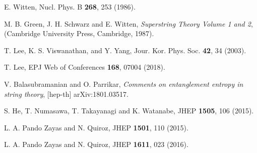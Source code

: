 \documentclass[aps,showpacs,showkeys]{revtex4}
\begin{document}
\begin{thebibliography}{0}
E. Witten, Nucl. Phys. B {\bf 268}, 253 (1986). 

M. B. Green, J. H. Schwarz and E. Witten, {\it Superstring Theory Volume 1 and 2},
(Cambridge University Press, Cambridge, 1987).
 
T. Lee, K. S. Viswanathan, and Y. Yang, Jour. Kor. Phys. Soc. {\bf 42}, 34 (2003).

T. Lee, EPJ Web of Conferences {\bf 168}, 07004 (2018).

V. Balasubramanian and O. Parrikar, 
{\it Comments on entanglement entropy in string theory},
[hep-th] arXiv:1801.03517.

S. He, T. Numasawa, T. Takayanagi and K. Watanabe, JHEP {\bf 1505}, 106 (2015). 

L. A. Pando Zayas and N. Quiroz, JHEP {\bf 1501}, 110 (2015). 

L. A. Pando Zayas and N. Quiroz, JHEP {\bf 1611}, 023 (2016).



\end{thebibliography}
\end{document}
